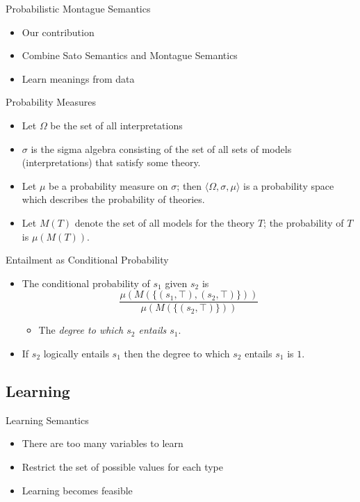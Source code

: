 \documentclass{beamer}
\newlength{\wideitemsep}
\let\olditem\item
\renewcommand{\item}{\setlength{\itemsep}{\wideitemsep}\olditem}
\begin{document}
\begin{frame}{Probabilistic Montague Semantics}
\begin{itemize}
\item Our contribution
\item Combine Sato Semantics and Montague Semantics
\item Learn meanings from data
\end{itemize}
\end{frame}

\begin{frame}{Probability Measures}
  \begin{itemize}
  \item Let $\Omega$ be the set of all interpretations
  \item $\sigma$ is the sigma algebra consisting of the set of all
    sets of models (interpretations) that satisfy some theory.
  \item Let $\mu$ be a probability measure on $\sigma$; then
    $\langle\Omega,\sigma,\mu\rangle$ is a probability space which
    describes the probability of theories.
  \item Let $M(T)$ denote the set of all models for the theory $T$;
    the probability of $T$ is $\mu(M(T))$.
  \end{itemize}
\end{frame}

\begin{frame}{Entailment as Conditional Probability}
  \begin{itemize}
  \item The conditional probability of $s_1$ given $s_2$ is
    $$\frac{\mu(M(\{(s_1, \top), (s_2, \top)\}))}{\mu(M(\{(s_2,\top)\}))}$$
    \begin{itemize}
    \item The {\em degree to which $s_2$ entails $s_1$\/}. 
    \end{itemize}
  \item If $s_2$ logically entails $s_1$ then the degree to which  $s_2$ entails $s_1$ is $1$.
\end{itemize}
\end{frame}

\subsection{Learning}

\begin{frame}{Learning Semantics}
  \begin{itemize}
  \item There are too many variables to learn
  \item Restrict the set of possible values for each type
  \item Learning becomes feasible
  \end{itemize}
\end{frame}
\end{document}
